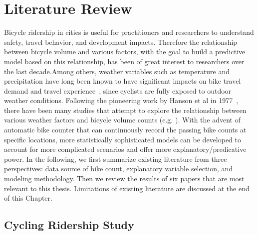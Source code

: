 \documentclass [11pt, proquest] {uwthesis}[2015/03/03]
\begin{document}
 
 
\chapter{Literature Review}

Bicycle ridership in cities is useful for practitioners and researchers to understand safety, travel behavior, and development impacts. Therefore the relationship between bicycle volume and various factors, with the goal to build a predictive model based on this relationship, has been of great interest to researchers over the last decade.Among others, weather variables such as temperature and precipitation have long been known to have significant impacts on bike travel demand and travel experience~\cite{Guo07}, since cyclists are fully exposed to outdoor weather conditions. Following the pioneering work by Hanson et al in 1977~\cite{Hanson77}, there have been many studies that attempt to explore the relationship between various weather factors and bicycle volume counts (e.g. \cite{Griswold:2011aa,Fields:2012aa,Niemeier:1996aa,Nosal:2014aa, PeterWeiran16}). With the advent of automatic bike counter that can continuously record the passing bike counts at specific locations, more statistically sophisticated models can be developed to account for more complicated scenarios and offer more explanatory/predicative power. In the following, we first summarize existing literature from three perspectives: data source of bike count, explanatory variable selection, and modeling methodology. Then we review the results of six papers that are most relevant to this thesis. Limitations of existing literature are discussed at the end of this Chapter.



\section{Cycling Ridership Study}
\end{document}
